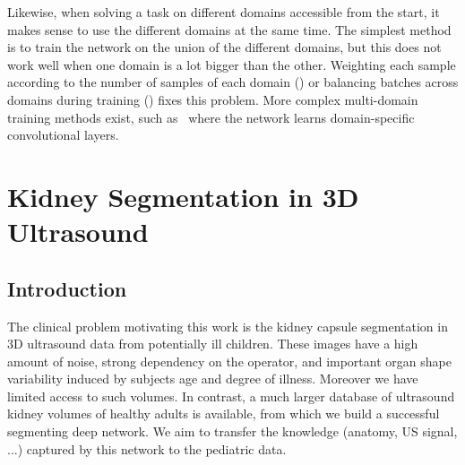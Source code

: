 Likewise, when solving a task on different domains accessible from the start, it makes sense to use the different domains at the same time. The simplest method is to train the network on the union of the different domains, but this does not work well when one domain is a lot bigger than the other. Weighting each sample according to the number of samples of each domain (\textcite{daume2007}) or balancing batches across domains during training (\textcite{buda2017}) fixes this problem. More complex multi-domain training methods exist, such as~\textcite{nam2016CVPR} where the network learns domain-specific convolutional layers.





\section{Kidney Segmentation in 3D Ultrasound}
\label{sec:kidney}

\subsection{Introduction}


The clinical problem motivating this work is the kidney capsule segmentation in 3D ultrasound data from potentially ill children. These images have a high amount of noise, strong dependency on the operator, and important organ shape variability induced by subjects age and degree of illness. Moreover we have limited access to such volumes. In contrast, a much larger database of ultrasound kidney volumes of healthy adults is available, from which we build a successful segmenting deep network. We aim to transfer the knowledge (anatomy, US signal, ...) captured by this network to the pediatric data. 

